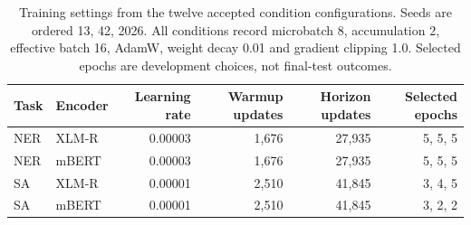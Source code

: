 \begin{table}[t]
\centering\footnotesize
\caption{Training settings from the twelve accepted condition configurations. Seeds are ordered 13, 42, 2026. All conditions record microbatch 8, accumulation 2, effective batch 16, AdamW, weight decay 0.01 and gradient clipping 1.0. Selected epochs are development choices, not final-test outcomes.}
\label{tab:training_configs}
\begin{tabular}{llrrrr}
\toprule
Task & Encoder & Learning rate & Warmup updates & Horizon updates & Selected epochs\\
\midrule
NER & XLM-R & 0.00003 & 1,676 & 27,935 & 5, 5, 5\\
NER & mBERT & 0.00003 & 1,676 & 27,935 & 5, 5, 5\\
SA & XLM-R & 0.00001 & 2,510 & 41,845 & 3, 4, 5\\
SA & mBERT & 0.00001 & 2,510 & 41,845 & 3, 2, 2\\
\bottomrule
\end{tabular}
\end{table}

